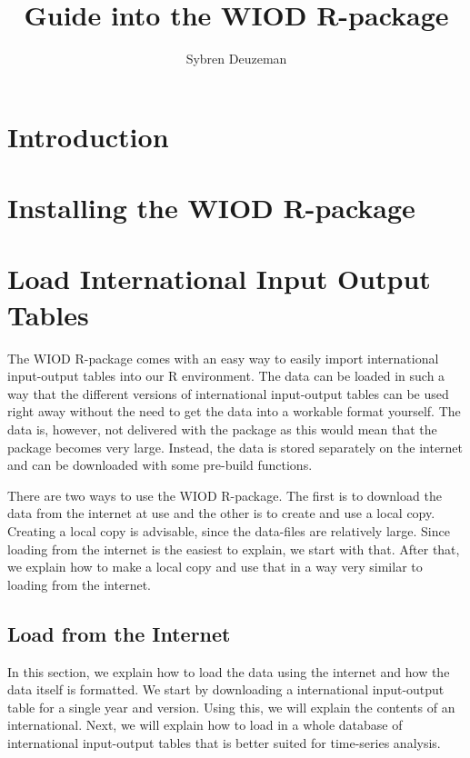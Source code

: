 \documentclass[10pt,a4paper]{paper}
\title{Guide into the WIOD R-package}
\author{Sybren Deuzeman}
\begin{document}
	\maketitle
	
	\section{Introduction}
	
	\section{Installing the WIOD R-package}
	
	\section{Load International Input Output Tables}
	
	The WIOD R-package comes with an easy way to easily import international input-output tables into our R environment. The data can be loaded in such a way that the different versions of international input-output tables can be used right away without the need to get the data into a workable format yourself. The data is, however, not delivered with the package as this would mean that the package becomes very large. Instead, the data is stored separately on the internet and can be downloaded with some pre-build functions. 
	
	There are two ways to use the WIOD R-package. The first is to download the data from the internet at use and the other is to create and use a local copy. Creating a local copy is advisable, since the data-files are relatively large. Since loading from the internet is the easiest to explain, we start with that. After that, we explain how to make a local copy and use that in a way very similar to loading from the internet.
	
	\subsection{Load from the Internet}
	
	In this section, we explain how to load the data using the internet and how the data itself is formatted. We start by downloading a international input-output table for a single year and version. Using this, we will explain the contents of an international. Next, we will explain how to load in a whole database of international input-output tables that is better suited for time-series analysis.
	
\end{document}
